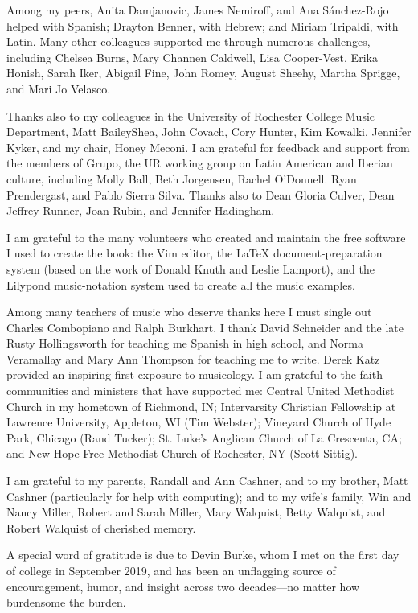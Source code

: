 Among my peers, Anita Damjanovic, James Nemiroff, and Ana Sánchez-Rojo helped
with Spanish; Drayton Benner, with Hebrew; and Miriam Tripaldi, with Latin.
Many other colleagues supported me through numerous challenges,
including 
Chelsea Burns,
Mary Channen Caldwell,
Lisa Cooper-Vest,
Erika Honish, 
Sarah Iker,
Abigail Fine,
John Romey,
August Sheehy, 
Martha Sprigge,
and
Mari Jo Velasco.


Thanks also to my colleagues in the University of Rochester
College Music Department,
Matt BaileyShea,
John Covach,
Cory Hunter,
Kim Kowalki,
Jennifer Kyker, 
and my chair, Honey Meconi.
I am grateful for feedback and support from the members of Grupo, the UR
working group on Latin American and Iberian culture, including
Molly Ball,
Beth Jorgensen,
Rachel O'Donnell.
Ryan Prendergast, 
and
Pablo Sierra Silva.
Thanks also to Dean Gloria Culver, Dean Jeffrey Runner, Joan Rubin, and
Jennifer Hadingham.

I am grateful to the many volunteers who created and maintain the free
software I used to create the book: the Vim editor, the \LaTeX{}
document-preparation system (based on the work of Donald Knuth and Leslie
Lamport), and the Lilypond music-notation system used to create all the music
examples.

Among many teachers of music who deserve thanks here I must single out
Charles Combopiano and Ralph Burkhart.
I thank David Schneider and the late Rusty Hollingsworth for teaching me
Spanish in high school, and Norma Veramallay and Mary Ann Thompson for
teaching me to write.
Derek Katz provided an inspiring first exposure to musicology.
I am grateful to the faith communities and ministers that have supported me:
Central United Methodist Church in my hometown of Richmond, IN; Intervarsity
Christian Fellowship at Lawrence University, Appleton, WI (Tim Webster);
Vineyard Church of Hyde Park, Chicago (Rand Tucker); St. Luke's Anglican
Church of La Crescenta, CA; and New Hope Free Methodist Church of Rochester,
NY (Scott Sittig).

I am grateful to my parents, Randall and Ann Cashner, and to my brother, Matt
Cashner (particularly for help with computing); and to my wife's family, Win
and Nancy Miller, Robert and Sarah Miller, Mary Walquist, Betty Walquist,
and Robert Walquist of cherished memory.

A special word of gratitude is due to Devin Burke, whom I met on the first day
of college in September 2019, and has been an unflagging source of
encouragement, humor, and insight across two decades---no matter how
burdensome the burden.

